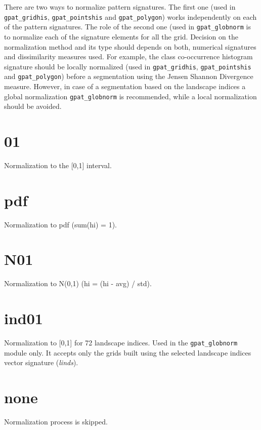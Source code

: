 There are two ways to normalize pattern signatures.
The first one (used in {\tt gpat\_gridhis}, {\tt gpat\_pointshis} and {\tt gpat\_polygon}) works independently on each of the pattern signatures.
The role of the second one (used in {\tt gpat\_globnorm} is to normalize each of the signature elements for all the grid. 
Decision on the normalization method and its type should depends on both, numerical signatures and dissimilarity measures used.
For example, the class co-occurrence histogram signature should be locally normalized (used in {\tt gpat\_gridhis}, {\tt gpat\_pointshis} and {\tt gpat\_polygon}) before a segmentation using the Jensen Shannon Divergence measure.
However, in case of a segmentation based on the landscape indices a global normalization {\tt gpat\_globnorm} is recommended, while a local normalization should be avoided.

\section{01}

Normalization to the [0,1] interval.

\section{pdf}

Normalization to pdf (sum(hi) = 1).

\section{N01}

Normalization to N(0,1) (hi = (hi - avg) / std).

\section{ind01}

Normalization to [0,1] for 72 landscape indices.
Used in the {\tt gpat\_globnorm} module only.
It accepts only the grids built using the selected landscape indices vector signature ({\it linds}).

\section{none}

Normalization process is skipped. 
